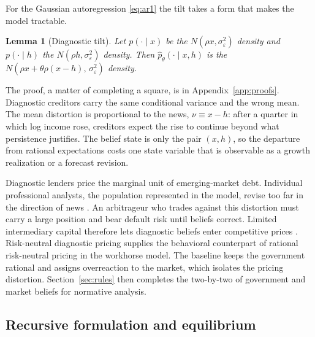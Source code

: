 \documentclass[11pt]{article}
\newtheorem{lemma}{Lemma}
\theoremstyle{definition}
\begin{document}
For the Gaussian autoregression \eqref{eq:ar1} the tilt takes a form that makes the model tractable.

\begin{lemma}[Diagnostic tilt]\label{lem:tilt}
Let $p(\cdot \mid x)$ be the $N(\rho x, \sigma_\varepsilon^2)$ density and $p(\cdot \mid h)$ the $N(\rho h, \sigma_\varepsilon^2)$ density. Then $\hat p_\theta(\cdot \mid x, h)$ is the $N\!\left(\rho x + \theta \rho (x - h),\, \sigma_\varepsilon^2\right)$ density.
\end{lemma}

The proof, a matter of completing a square, is in Appendix~\ref{app:proofs}. Diagnostic creditors carry the same conditional variance and the wrong mean. The mean distortion is proportional to the news, $\nu \equiv x - h$: after a quarter in which log income rose, creditors expect the rise to continue beyond what persistence justifies. The belief state is only the pair $(x, h)$, so the departure from rational expectations costs one state variable that is observable as a growth realization or a forecast revision.

Diagnostic lenders price the marginal unit of emerging-market debt. Individual professional analysts, the population represented in the model, revise too far in the direction of news \citep{BordaloGennaioliMaShleifer2020, BordaloEtAl2022JEP}. An arbitrageur who trades against this distortion must carry a large position and bear default risk until beliefs correct. Limited intermediary capital therefore lets diagnostic beliefs enter competitive prices \citep{GreenwoodHanson2013, LopezSalidoSteinZakrajsek2017}. Risk-neutral diagnostic pricing supplies the behavioral counterpart of rational risk-neutral pricing in the workhorse model. The baseline keeps the government rational and assigns overreaction to the market, which isolates the pricing distortion. Section~\ref{sec:rules} then completes the two-by-two of government and market beliefs for normative analysis.

\subsection{Recursive formulation and equilibrium}
\end{document}
